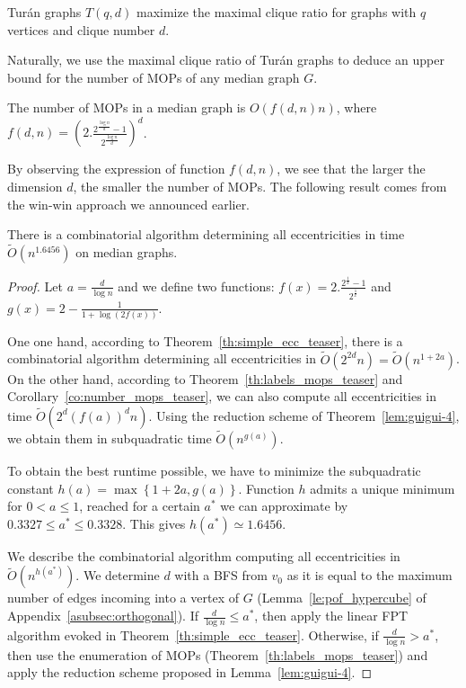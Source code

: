 \documentclass[a4paper,UKenglish,numberwithinsect,cleveref, autoref]{lipics-v2021}
\newcommand{\set}[1]{\left\{ #1 \right\}}
\begin{document}
\begin{theorem}[\ref{th:turan}]
Tur\'an graphs $T(q,d)$ maximize the maximal clique ratio for graphs with $q$ vertices and clique number $d$.
\label{th:turan_teaser}
\end{theorem}

Naturally, we use the maximal clique ratio of Tur\'an graphs to deduce an upper bound for the number of MOPs of any median graph $G$.

\begin{corollary}[\ref{co:number_mops}]
The number of MOPs in a median graph is $O(f(d,n)n)$, where $f(d,n) = \left(2.\frac{2^{\frac{\log n}{d}}-1}{2^{\frac{\log n}{d}}}\right)^d$.
\label{co:number_mops_teaser}
\end{corollary}

By observing the expression of function $f(d,n)$, we see that the larger the dimension $d$, the smaller the number of MOPs. The following result comes from the win-win approach we announced earlier.

\begin{theorem}
There is a combinatorial algorithm determining all eccentricities in time $\tilde{O}(n^{1.6456})$ on median graphs.
\label{th:subquadramop}
\end{theorem}
\begin{proof}
Let $a = \frac{d}{\log n}$ and we define two functions: $f(x) = 2.\frac{2^{\frac{1}{x}}-1}{2^{\frac{1}{x}}}$ and $g(x) = 2-\frac{1}{1+\log (2f(x))}$.

One one hand, according to Theorem~\ref{th:simple_ecc_teaser}, there is a combinatorial algorithm determining all eccentricities in $\tilde{O}(2^{2d}n) = \tilde{O}(n^{1+2a})$. 
On the other hand, according to Theorem~\ref{th:labels_mops_teaser} and Corollary~\ref{co:number_mops_teaser}, we can also compute all eccentricities in time $\tilde{O}(2^d(f(a))^dn)$. Using the reduction scheme of Theorem~\ref{lem:guigui-4}, we obtain them in subquadratic time $\tilde{O}(n^{g(a)})$.

To obtain the best runtime possible, we have to minimize the subquadratic constant $h(a) =\max \set{1+2a,g(a)}$. Function $h$ admits a unique minimum for $0 < a \le 1$, reached for a certain $a^*$ we can approximate by $0.3327 \le a^* \le 0.3328$. This gives $h(a^*) \simeq 1.6456$.

We describe the combinatorial algorithm computing all eccentricities in $\tilde{O}(n^{h(a^*)})$. We determine $d$ with a BFS from $v_0$ as it is equal to the maximum number of edges incoming into a vertex of $G$ (Lemma~\ref{le:pof_hypercube} of Appendix~\ref{asubsec:orthogonal}).
If $\frac{d}{\log n} \le a^*$, then apply the linear FPT algorithm evoked in Theorem~\ref{th:simple_ecc_teaser}. Otherwise, if $\frac{d}{\log n} > a^*$, then use the enumeration of MOPs (Theorem~\ref{th:labels_mops_teaser}) and apply the reduction scheme proposed in Lemma~\ref{lem:guigui-4}.
\end{proof}
\end{document}
